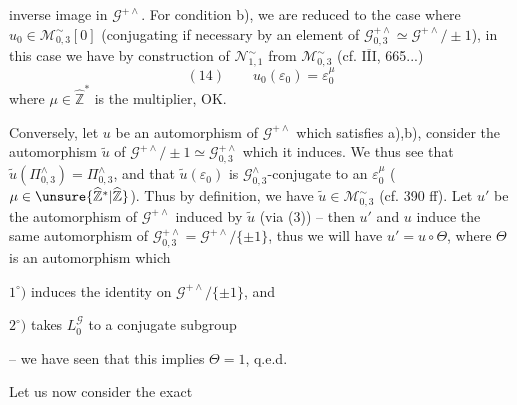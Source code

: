 
inverse image in $\mathcal{G}^{+\wedge}$. For condition
b), we are reduced to the case where $u_{0}\in\mathcal{M}_{0,3}^{\sim}[0]$
(conjugating if necessary by an element of
$\mathcal{G}_{0,3}^{+\wedge}\simeq\mathcal{G}^{+\wedge}/\!\pm1$),
in this case we have by construction of $\mathcal{N}_{1,1}^{\sim}$ from
$\mathcal{M}_{0,3}^{\sim}$ (cf. \uline{\(\overline{\mathrm{III}}\)},  665...)
\[
(14)\qquad u_{0}(\varepsilon_{0})=\varepsilon_{0}^{\mu}
\]
where $\mu\in\widehat{\mathbb{Z}}^{*}$ is the multiplier, OK.

Conversely, let $u$ be an automorphism of $\mathcal{G}^{+\wedge}$ which
satisfies a),b), consider the automorphism $\widetilde{u}$ of
$\mathcal{G}^{+\wedge}/\!\pm1\simeq\mathcal{G}_{0,3}^{+\wedge}$
which it induces. We thus see
that $\widetilde{u}(\Pi_{0,3}^{\wedge})=\Pi_{0,3}^{\wedge}$, and that
$\widetilde{u}(\varepsilon_{0})$ is $\mathcal{G}_{0,3}^{\wedge}$-conjugate
to an $\varepsilon_{0}^{\mu}$ ($\mu\in\unsure{\widehat{\mathbb{Z}}^{*}|\widehat{\mathbb{Z}}}$).
 Thus by
definition, we have $\widetilde{u}\in\mathcal{M}_{0,3}^{\sim}$
(cf.  390 ff).
Let $u'$ be the automorphism of $\mathcal{G}^{+\wedge}$ induced by $\widetilde{u}$
(via (3)) -- then $u'$ and $u$ induce the same
automorphism of $\mathcal{G}_{0,3}^{+\wedge}=\mathcal{G}^{+\wedge}/\{\pm1\}$,
thus we will have $u'=u\circ\Theta$, where
$\Theta$ is an automorphism which

$1^\circ)$ induces the identity on $\mathcal{G}^{+\wedge}/\{\pm1\}$, and

$2^\circ)$ takes $L_{0}^{\mathcal{G}}$ to a conjugate subgroup

-- we have seen that this implies $\Theta=1$, q.e.d.

Let us now consider the exact 


